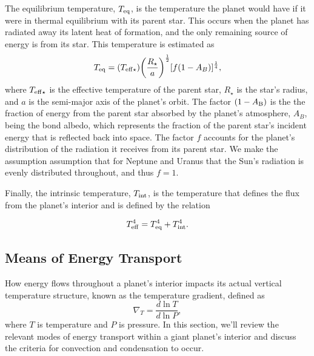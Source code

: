 \documentclass[11pt]{ucscthesisbs}
\begin{document}
The equilibrium temperature, $T_{\rm eq}$, is the temperature the planet would have if it were in thermal equilibrium with its parent star. This occurs when the planet has radiated away its latent heat of formation, and the only remaining source of energy is from its star. This temperature\citep{seager_2010} is estimated as
\begin{equation}
    T_{\rm eq} = (T_{\rm eff\star})\bigg(\frac{R_{\star}}{a}\bigg)^{\frac{1}{2}}[f(1-A_{B})]^{\frac{1}{4}},
  \label{eq:equilibrium_temp}
\end{equation} 
where $T_{\rm eff\star}$ is the effective temperature of the parent star, $R_{\star}$ is the star's radius, and $a$ is the semi-major axis of the planet's orbit. The factor $(1 - A_{\rm B})$ is the the fraction of energy from the parent star absorbed by the planet's atmosphere, $A_{B}$, being the bond albedo, which represents the fraction of the parent star's incident energy that is reflected back into space. The factor $f$ accounts for the planet's distribution of the radiation it receives from its parent star. We make the assumption assumption that for Neptune and Uranus that the Sun's radiation is evenly distributed throughout, and thus $f = 1$. 

Finally, the intrinsic temperature, $T_{\rm int}$, is the temperature that defines the flux from the planet's interior and is defined by the relation

\begin{equation}
    T_{\rm eff}^4 =  T_{\rm eq}^4 +  T_{\rm int}^4.
  \label{eq:effective_temp}
\end{equation} 

\subsection{Means of Energy Transport}
How energy flows throughout a planet's interior impacts its actual vertical temperature structure, known as the temperature gradient, defined as
\begin{equation}
  \nabla_{T} = \frac{d \ln T}{d\ln P} ,
\end{equation}
where $T$ is temperature and $P$ is pressure. In this section, we'll review the relevant modes of energy transport within a giant planet's interior and discuss the criteria for convection and condensation to occur.
\end{document}
